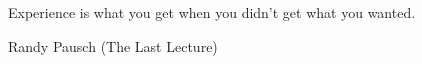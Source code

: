 \vspace*{0.8\textheight}
\setlength{\epigraphwidth}{9cm}
\renewcommand{\textflush}{flushright}
\epigraph{Experience is what you get when you didn’t get what you wanted.}
            {Randy Pausch (The Last Lecture)}